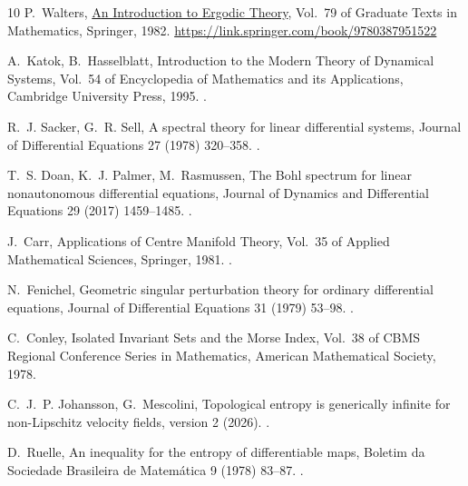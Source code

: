 \documentclass[review,12pt,times,a4paper,nopreprintline]{elsarticle}
\theoremstyle{plain}
\theoremstyle{definition}
\theoremstyle{remark}
\numberwithin{equation}{section}
\begin{document}
\begin{thebibliography}{10}
P.~Walters, \href{https://link.springer.com/book/9780387951522}{An Introduction
  to Ergodic Theory}, Vol.~79 of Graduate Texts in Mathematics, Springer, 1982.
\newline\urlprefix\url{https://link.springer.com/book/9780387951522}

A.~Katok, B.~Hasselblatt, Introduction to the Modern Theory of Dynamical
  Systems, Vol.~54 of Encyclopedia of Mathematics and its Applications,
  Cambridge University Press, 1995.
\newblock \href {https://doi.org/10.1017/CBO9780511809187}
  {}.

R.~J. Sacker, G.~R. Sell, A spectral theory for linear differential systems,
  Journal of Differential Equations 27 (1978) 320--358.
\newblock \href {https://doi.org/10.1016/0022-0396(78)90057-8}
  {}.

T.~S. Doan, K.~J. Palmer, M.~Rasmussen, The {Bohl} spectrum for linear
  nonautonomous differential equations, Journal of Dynamics and Differential
  Equations 29 (2017) 1459--1485.
\newblock \href {https://doi.org/10.1007/s10884-016-9530-x}
  {}.

J.~Carr, Applications of Centre Manifold Theory, Vol.~35 of Applied
  Mathematical Sciences, Springer, 1981.
\newblock \href {https://doi.org/10.1007/978-1-4612-5929-9}
  {}.

N.~Fenichel, Geometric singular perturbation theory for ordinary differential
  equations, Journal of Differential Equations 31 (1979) 53--98.
\newblock \href {https://doi.org/10.1016/0022-0396(79)90152-9}
  {}.

C.~Conley, Isolated Invariant Sets and the Morse Index, Vol.~38 of CBMS
  Regional Conference Series in Mathematics, American Mathematical Society,
  1978.

C.~J.~P. Johansson, G.~Mescolini, Topological entropy is generically infinite
  for non-{Lipschitz} velocity fields, version 2 (2026).
\newblock \href {https://arxiv.org/abs/2604.01077v2}
  {}.

D.~Ruelle, An inequality for the entropy of differentiable maps, Boletim da
  Sociedade Brasileira de Matem{\'a}tica 9 (1978) 83--87.
\newblock \href {https://doi.org/10.1007/BF02584795}
  {}.


\end{thebibliography}
\end{document}
